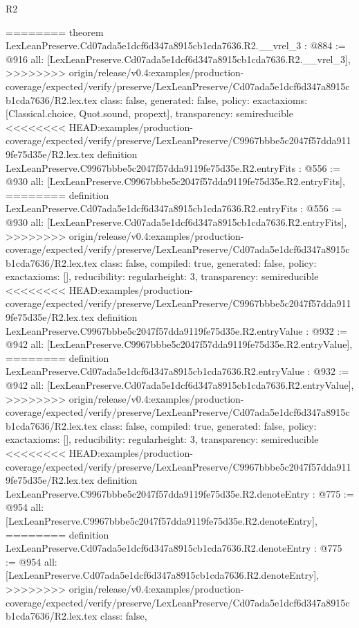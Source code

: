 \begin{lexlean}{R2}
\begin{coremodule}
{{{{{{{{{{{{{{{========
theorem LexLeanPreserve.Cd07ada5e1dcf6d347a8915cb1cda7636.R2.__vrel_3 : @884 := @916 {
  all: [LexLeanPreserve.Cd07ada5e1dcf6d347a8915cb1cda7636.R2.__vrel_3],
>>>>>>>> origin/release/v0.4:examples/production-coverage/expected/verify/preserve/LexLeanPreserve/Cd07ada5e1dcf6d347a8915cb1cda7636/R2.lex.tex
  class: false,
  generated: false,
  policy: exact{axioms: [Classical.choice, Quot.sound, propext]},
  transparency: semireducible
}
<<<<<<<< HEAD:examples/production-coverage/expected/verify/preserve/LexLeanPreserve/C9967bbbe5c2047f57dda9119fe75d35e/R2.lex.tex
definition LexLeanPreserve.C9967bbbe5c2047f57dda9119fe75d35e.R2.entryFits : @556 := @930 {
  all: [LexLeanPreserve.C9967bbbe5c2047f57dda9119fe75d35e.R2.entryFits],
========
definition LexLeanPreserve.Cd07ada5e1dcf6d347a8915cb1cda7636.R2.entryFits : @556 := @930 {
  all: [LexLeanPreserve.Cd07ada5e1dcf6d347a8915cb1cda7636.R2.entryFits],
>>>>>>>> origin/release/v0.4:examples/production-coverage/expected/verify/preserve/LexLeanPreserve/Cd07ada5e1dcf6d347a8915cb1cda7636/R2.lex.tex
  class: false,
  compiled: true,
  generated: false,
  policy: exact{axioms: []},
  reducibility: regular{height: 3},
  transparency: semireducible
}
<<<<<<<< HEAD:examples/production-coverage/expected/verify/preserve/LexLeanPreserve/C9967bbbe5c2047f57dda9119fe75d35e/R2.lex.tex
definition LexLeanPreserve.C9967bbbe5c2047f57dda9119fe75d35e.R2.entryValue : @932 := @942 {
  all: [LexLeanPreserve.C9967bbbe5c2047f57dda9119fe75d35e.R2.entryValue],
========
definition LexLeanPreserve.Cd07ada5e1dcf6d347a8915cb1cda7636.R2.entryValue : @932 := @942 {
  all: [LexLeanPreserve.Cd07ada5e1dcf6d347a8915cb1cda7636.R2.entryValue],
>>>>>>>> origin/release/v0.4:examples/production-coverage/expected/verify/preserve/LexLeanPreserve/Cd07ada5e1dcf6d347a8915cb1cda7636/R2.lex.tex
  class: false,
  compiled: true,
  generated: false,
  policy: exact{axioms: []},
  reducibility: regular{height: 3},
  transparency: semireducible
}
<<<<<<<< HEAD:examples/production-coverage/expected/verify/preserve/LexLeanPreserve/C9967bbbe5c2047f57dda9119fe75d35e/R2.lex.tex
definition LexLeanPreserve.C9967bbbe5c2047f57dda9119fe75d35e.R2.denoteEntry : @775 := @954 {
  all: [LexLeanPreserve.C9967bbbe5c2047f57dda9119fe75d35e.R2.denoteEntry],
========
definition LexLeanPreserve.Cd07ada5e1dcf6d347a8915cb1cda7636.R2.denoteEntry : @775 := @954 {
  all: [LexLeanPreserve.Cd07ada5e1dcf6d347a8915cb1cda7636.R2.denoteEntry],
>>>>>>>> origin/release/v0.4:examples/production-coverage/expected/verify/preserve/LexLeanPreserve/Cd07ada5e1dcf6d347a8915cb1cda7636/R2.lex.tex
  class: false,
}}}}}}}}}}}}}}}}}}}
\end{coremodule}
\end{lexlean}
